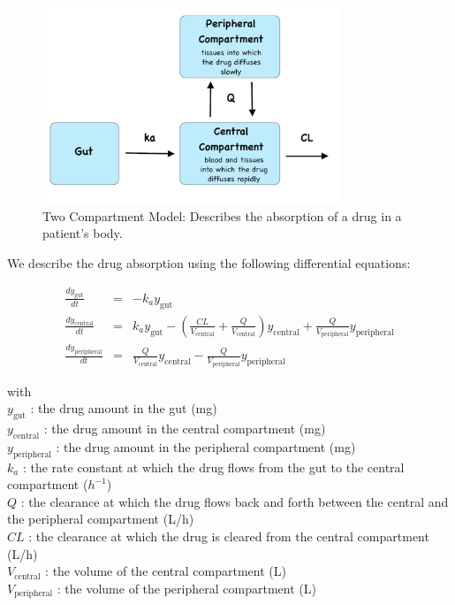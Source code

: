 \documentclass[11pt]{amsart}
\begin{document}
\begin{figure}[!htb]
\begin{center}
\includegraphics[width=3.5in,trim=0in 0in 0 0in]{graphics/appendix/twoCpt.png}
\caption{{Two Compartment Model: Describes the absorption of a drug in a patient's body.}}
\label{TwoCptNice}
\end{center}
\end{figure}

We describe the drug absorption using the following differential equations:

\begin{eqnarray*}
  \frac{dy_{\mathrm{gut}}}{dt} &=& -k_a y_{\mathrm{gut}} \\
  \frac{dy_{\mathrm{central}}}{dt} &=& k_a y_{\mathrm{gut}} - (\frac{CL}{V_{\mathrm{central}}} + \frac{Q}{V_{\mathrm{central}}}) y_{\mathrm{central}} +  \frac{Q}{V_{\mathrm{peripheral}}} y_{\mathrm{peripheral}} \\
\frac{dy_{\mathrm{peripheral}}}{dt} &=& \frac{Q}{V_{\mathrm{central}}} y_{\mathrm{central}} - \frac{Q}{V_{\mathrm{peripheral}}} y_{\mathrm{peripheral}}
\end{eqnarray*}

with \\  
$y_{\mathrm{gut}}$ : the drug amount in the gut (mg)  \\
$y_{\mathrm{central}}$ : the drug amount in the central compartment (mg)  \\
$y_{\mathrm{peripheral}}$ : the drug amount in the peripheral compartment (mg)  \\
$k_a$ : the rate constant at which the drug flows from the gut to the central compartment ($h^{-1}$)  \\
$Q$ : the clearance at which the drug flows back and forth between the central and the peripheral compartment (L/h) \\ 
$CL$ : the clearance at which the drug is cleared from the central compartment (L/h)  \\
$V_{\mathrm{central}}$ : the volume of the central compartment (L)  \\
$V_{\mathrm{peripheral}}$ : the volume of the peripheral compartment (L) \\
\end{document}

